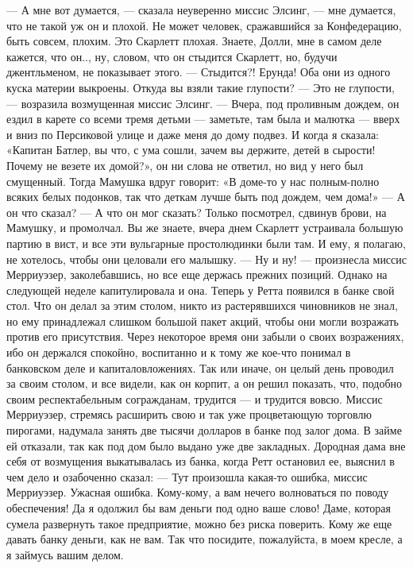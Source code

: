 — А мне вот думается, — сказала неуверенно миссис Элсинг, — мне думается, что не такой уж он и плохой. Не может человек, сражавшийся за Конфедерацию, быть совсем, плохим. Это Скарлетт плохая. Знаете, Долли, мне в самом деле кажется, что он.., ну, словом, что он стыдится Скарлетт, но, будучи джентльменом, не показывает этого.
— Стыдится?! Ерунда! Оба они из одного куска материи выкроены. Откуда вы взяли такие глупости?
— Это не глупости, — возразила возмущенная миссис Элсинг. — Вчера, под проливным дождем, он ездил в карете со всеми тремя детьми — заметьте, там была и малютка — вверх и вниз по Персиковой улице и даже меня до дому подвез. И когда я сказала:
«Капитан Батлер, вы что, с ума сошли, зачем вы держите, детей в сырости! Почему не везете их домой?», он ни слова не ответил, но вид у него был смущенный. Тогда Мамушка вдруг говорит:
«В доме-то у нас полным-полно всяких белых подонков, так что деткам лучше быть под дождем, чем дома!» — А он что сказал?
— А что он мог сказать? Только посмотрел, сдвинув брови, на Мамушку, и промолчал. Вы же знаете, вчера днем Скарлетт устраивала большую партию в вист, и все эти вульгарные простолюдинки были там. И ему, я полагаю, не хотелось, чтобы они целовали его малышку.
— Ну и ну! — произнесла миссис Мерриуэзер, заколебавшись, но все еще держась прежних позиций. Однако на следующей неделе капитулировала и она.
Теперь у Ретта появился в банке свой стол. Что он делал за этим столом, никто из растерявшихся чиновников не знал, но ему принадлежал слишком большой пакет акций, чтобы они могли возражать против его присутствия. Через некоторое время они забыли о своих возражениях, ибо он держался спокойно, воспитанно и к тому же кое-что понимал в банковском деле и капиталовложениях. Так или иначе, он целый день проводил за своим столом, и все видели, как он корпит, а он решил показать, что, подобно своим респектабельным согражданам, трудится — и трудится вовсю.
Миссис Мерриуэзер, стремясь расширить свою и так уже процветающую торговлю пирогами, надумала занять две тысячи долларов в банке под залог дома. В займе ей отказали, так как под дом было выдано уже две закладных. Дородная дама вне себя от возмущения выкатывалась из банка, когда Ретт остановил ее, выяснил в чем дело и озабоченно сказал:
— Тут произошла какая-то ошибка, миссис Мерриуэзер. Ужасная ошибка. Кому-кому, а вам нечего волноваться по поводу обеспечения! Да я одолжил бы вам деньги под одно ваше слово! Даме, которая сумела развернуть такое предприятие, можно без риска поверить. Кому же еще давать банку деньги, как не вам. Так что посидите, пожалуйста, в моем кресле, а я займусь вашим делом.
